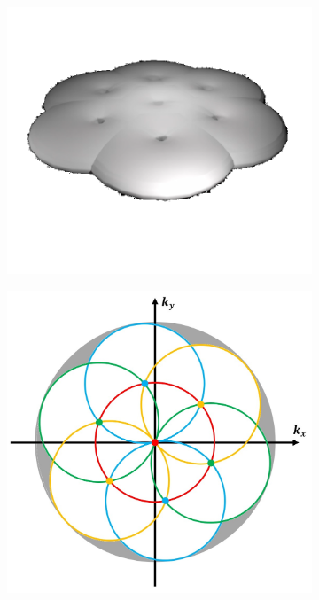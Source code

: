 \begin{figure}
	\begin{subfigure}[t]{0.4\textwidth}
		\centering
		\includegraphics[width=\linewidth]{images/2D_SIM_OTF_all_2D_angles.png}
		\caption{}
		\label{fig:2D_SIM_OTF_all_2D_angles}
	\end{subfigure}
	\begin{subfigure}[t]{0.5\textwidth}
		\centering
		\includegraphics[width=\linewidth]{images/3D_SIM_OTF_xy_expansion_w_double_rad_filled.jpg}

\end{subfigure}
\end{figure}

